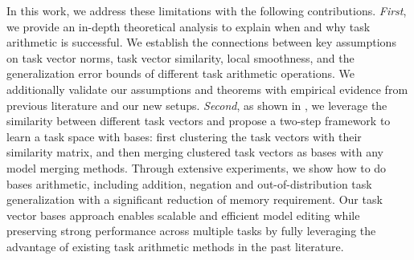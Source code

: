 In this work, we address these limitations with the following contributions. \emph{First}, we provide an in-depth theoretical analysis to explain when and why task arithmetic is successful. We establish the connections between key assumptions on task vector norms, task vector similarity, local smoothness, and the generalization error bounds of different task arithmetic operations. We additionally validate our assumptions and theorems with empirical evidence from previous literature and our new setups. \emph{Second}, as shown in , we leverage the similarity between different task vectors and propose a two-step framework to learn a task space with bases: first clustering the task vectors with their similarity matrix, and then merging clustered task vectors as bases with any model merging methods. Through extensive experiments, we show how to do bases arithmetic, including addition, negation and out-of-distribution task generalization with a significant reduction of memory requirement. Our task vector bases approach enables scalable and efficient model editing while preserving strong performance across multiple tasks by fully leveraging the advantage of existing task arithmetic methods in the past literature. 